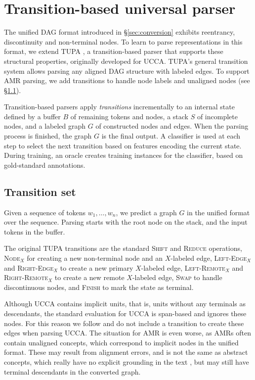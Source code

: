\documentclass[11pt,a4paper]{article}
\begin{document}
\section{Transition-based universal parser}\label{sec:model}

The unified DAG format introduced in \S\ref{sec:conversion}
exhibits reentrancy, discontinuity and non-terminal nodes.
To learn to parse representations in this format,
we extend TUPA \cite{hershcovich2017a},
a transition-based parser that supports these structural properties,
originally developed for UCCA.
TUPA's general transition system allows parsing any aligned DAG structure with labeled edges.
To support AMR parsing, we add transitions to handle node labels and unaligned nodes
(see \S\ref{sec:transition_set}).

Transition-based parsers \cite{Nivre03anefficient} apply \textit{transitions}
incrementally to an internal state defined by
a buffer $B$ of remaining tokens and nodes,
a stack $S$ of incomplete nodes,
and a labeled graph $G$ of constructed nodes and edges.
When the parsing process is finished, the graph $G$ is the final output.
A classifier is used at each step to select the next transition based on features
encoding the current state.
During training, an oracle creates training instances for the classifier,
based on gold-standard annotations.


\subsection{Transition set}\label{sec:transition_set}
Given a sequence of tokens $w_1, \ldots, w_n$,
we predict a graph $G$ in the unified format over the sequence.
Parsing starts with the root node on the stack,
and the input tokens in the buffer.

The original TUPA transitions are
the standard \textsc{Shift} and \textsc{Reduce} operations,
\textsc{Node$_X$} for creating a new non-terminal node and an $X$-labeled edge,
\textsc{Left-Edge$_X$} and \textsc{Right-Edge$_X$} to create a new primary $X$-labeled edge,
\textsc{Left-Remote$_X$} and \textsc{Right-Remote$_X$} to create a new remote $X$-labeled edge,
\textsc{Swap} to handle discontinuous nodes,
and \textsc{Finish} to mark the state as terminal.

Although UCCA contains implicit units, that is, units without
any terminals as descendants,
the standard evaluation for UCCA \cite{abend2013universal} is span-based and
ignores these nodes.
For this reason we follow \cite{hershcovich2017a} and do not include
a transition to create these edges when parsing UCCA.
The situation for AMR is even worse, as AMRs often contain unaligned concepts,
which correspond to implicit nodes in the unified format.
These may result from alignment errors,
and is not the same as abstract concepts,
which really have no explicit grounding in the text \cite{buys2017oxford},
but may still have terminal descendants in the converted graph.
\end{document}
